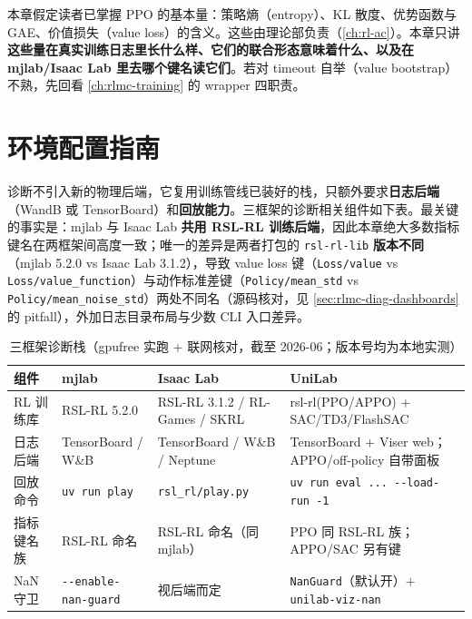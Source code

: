 \begin{note}
本章假定读者已掌握 PPO 的基本量：策略熵（entropy）、KL 散度、优势函数与 GAE、价值损失（value loss）的含义。这些由理论部负责（\cref{ch:rl-ac}）。本章只讲\textbf{这些量在真实训练日志里长什么样、它们的联合形态意味着什么、以及在 mjlab/Isaac Lab 里去哪个键名读它们}。若对 timeout 自举（value bootstrap）不熟，先回看 \cref{ch:rlmc-training} 的 wrapper 四职责。
\end{note}

\section*{环境配置指南}
\label{sec:rlmc-diag-setup}

诊断不引入新的物理后端，它复用训练管线已装好的栈，只额外要求\textbf{日志后端}（WandB 或 TensorBoard）和\textbf{回放能力}。三框架的诊断相关组件如下表。最关键的事实是：mjlab 与 Isaac Lab \textbf{共用 RSL-RL 训练后端}，因此本章绝大多数指标键名在两框架间高度一致；唯一的差异是两者打包的 \texttt{rsl-rl-lib} \textbf{版本不同}（mjlab 5.2.0 vs Isaac Lab 3.1.2），导致 value loss 键（\verb|Loss/value| vs \verb|Loss/value_function|）与动作标准差键（\verb|Policy/mean_std| vs \verb|Policy/mean_noise_std|）两处不同名（源码核对，见 \cref{sec:rlmc-diag-dashboards} 的 pitfall），外加日志目录布局与少数 CLI 入口差异。

\begin{table}[H]
\centering
\caption{三框架诊断栈（gpufree 实跑 + 联网核对，截至 2026-06；版本号均为本地实测）}
\label{tab:rlmc-diag-versions}
\begin{tabular}{llll}
\hline
组件 & mjlab & Isaac Lab & UniLab \\
\hline
RL 训练库 & RSL-RL 5.2.0 & RSL-RL 3.1.2 / RL-Games / SKRL & rsl-rl(PPO/APPO) $+$ SAC/TD3/FlashSAC \\
日志后端 & TensorBoard / W\&B & TensorBoard / W\&B / Neptune & TensorBoard $+$ Viser web；APPO/off-policy 自带面板 \\
回放命令 & \verb|uv run play| & \verb|rsl_rl/play.py| & \verb|uv run eval ... --load-run -1| \\
指标键名族 & RSL-RL 命名 & RSL-RL 命名（同 mjlab） & PPO 同 RSL-RL 族；APPO/SAC 另有键 \\
NaN 守卫 & \verb|--enable-nan-guard| & 视后端而定 & \verb|NanGuard|（默认开）$+$ \verb|unilab-viz-nan| \\
\hline
\end{tabular}
\end{table}

